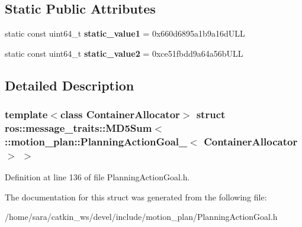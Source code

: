 \subsection*{Static Public Attributes}
\begin{DoxyCompactItemize}
\item 
\mbox{\label{structros_1_1message__traits_1_1MD5Sum_3_01_1_1motion__plan_1_1PlanningActionGoal___3_01ContainerAllocator_01_4_01_4_a5be74aa32c228d19bc48fd3bfe00f19d}} 
static const uint64\+\_\+t {\bfseries static\+\_\+value1} = 0x660d6895a1b9a16d\+U\+LL
\item 
\mbox{\label{structros_1_1message__traits_1_1MD5Sum_3_01_1_1motion__plan_1_1PlanningActionGoal___3_01ContainerAllocator_01_4_01_4_a08af7f19a952ec3ba28e880a9eba6f1e}} 
static const uint64\+\_\+t {\bfseries static\+\_\+value2} = 0xce51fbdd9a64a56b\+U\+LL
\end{DoxyCompactItemize}


\subsection{Detailed Description}
\subsubsection*{template$<$class Container\+Allocator$>$\newline
struct ros\+::message\+\_\+traits\+::\+M\+D5\+Sum$<$ \+::motion\+\_\+plan\+::\+Planning\+Action\+Goal\+\_\+$<$ Container\+Allocator $>$ $>$}



Definition at line 136 of file Planning\+Action\+Goal.\+h.



The documentation for this struct was generated from the following file\+:\begin{DoxyCompactItemize}
\item 
/home/sara/catkin\+\_\+ws/devel/include/motion\+\_\+plan/Planning\+Action\+Goal.\+h\end{DoxyCompactItemize}
